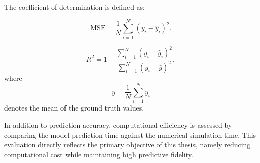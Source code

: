 The coefficient of determination is defined as:

\[
\mathrm{MSE} = \frac{1}{N} \sum_{i=1}^{N} \left( y_i - \hat{y}_i \right)^2.
\]

\[
R^2 = 1 - \frac{\sum_{i=1}^{N} \left( y_i - \hat{y}_i \right)^2}
{\sum_{i=1}^{N} \left( y_i - \bar{y} \right)^2},
\]
where
\[
\bar{y} = \frac{1}{N} \sum_{i=1}^{N} y_i
\]
denotes the mean of the ground truth values.

In addition to prediction accuracy, computational efficiency is assessed by comparing the model prediction time against the numerical simulation time. This evaluation directly reflects the primary objective of this thesis, namely reducing computational cost while maintaining high predictive fidelity.
